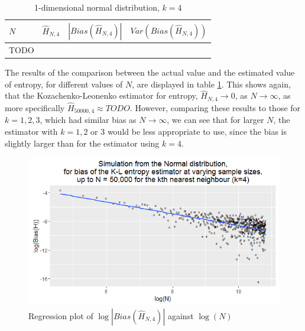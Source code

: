 \documentclass{report}
\begin{document}
\begin{table}
\caption{1-dimensional normal distribution, $k=4$} \label{normal_k=4_table}
\begin{center}
\begin{tabular}{| l | c c c|} 
\toprule
$N$ & $\hat{H}_{N, 4}$ & $|Bias(\hat{H}_{N, 4})|$ & $Var(Bias(\hat{H}_{N, 4}))$ \\
\midrule[1pt]
TODO & & & \\
\hline
\end{tabular}
\end{center}
\end{table}

The results of the comparison between the actual value and the estimated value of entropy, for different values of $N$, are displayed in table \ref{normal_k=4_table}. This shows again, that the Kozachenko-Leonenko estimator for entropy, $\hat{H}_{N, 4} \to 0$, as $N \to \infty$, as more specifically $\hat{H}_{50000, 4} \approx TODO$. However, comparing these results to those for $k=1, 2, 3$, which had similar bias as $N \to \infty$, we can see that for larger $N$, the estimator with $k=1, 2$ or $3$ would be less appropriate to use, since the bias is slightly larger than for the estimator using $k=4$.

\begin{figure}
  \begin{center}
    \includegraphics[width=\textwidth]{./Graphs/new_normal_k=4.png}
  \end{center}
\caption{Regression plot of $\log|Bias(\hat{H}_{N, 4})|$ against $\log(N)$}
  \label{normal_k=4_graph}
\end{figure}
\end{document}
